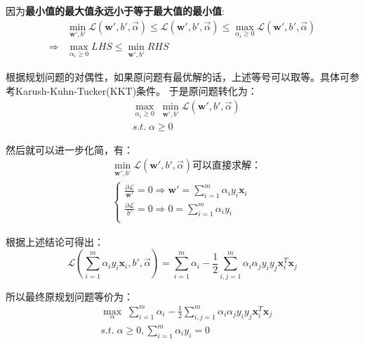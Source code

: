 \documentclass{article}
\begin{document}
因为\textbf{最小值的最大值永远小于等于最大值的最小值}:
\begin{equation}
	\begin{aligned}
		& \mathop{min}\limits_{\textbf{w}',b'}\mathcal{L}(\textbf{w}',b',\overrightarrow{\alpha})\leq\mathcal{L}(\textbf{w}',b',\overrightarrow{\alpha})\leq\mathop{max}\limits_{\alpha_i\geq 0}\mathcal{L}(\textbf{w}',b',\overrightarrow{\alpha})\\
		\Rightarrow & \mathop{max}\limits_{\alpha_i\geq 0}LHS\leq \mathop{min}\limits_{\textbf{w}',b'}RHS
	\end{aligned}
\end{equation}

根据规划问题的对偶性，如果原问题有最优解的话，上述等号可以取等。具体可参考Karush-Kuhn-Tucker(KKT)条件。
于是原问题转化为：
\begin{equation}
	\begin{aligned}
		& \mathop{max}\limits_{\alpha_i\geq 0}\;\mathop{min}\limits_{\textbf{w}',b'}\mathcal{L}(\textbf{w}',b',\overrightarrow{\alpha})\\
		& s.t.\;\alpha\geq 0
	\end{aligned}
\end{equation}

然后就可以进一步化简，有：
\begin{equation}
	\begin{aligned}
		& \mathop{min}\limits_{\textbf{w}',b'}\mathcal{L}(\textbf{w}',b',\overrightarrow{\alpha})\mbox{可以直接求解：}\\
		& \begin{cases}
			\frac{\partial\mathcal{L}}{\textbf{w}'}=0\Rightarrow \textbf{w}'=\sum_{i=1}^m\alpha_iy_i\textbf{x}_i\\
			\frac{\partial\mathcal{L}}{b'}=0\Rightarrow 0=\sum_{i=1}^m\alpha_iy_i\\
		\end{cases}
	\end{aligned}	
\end{equation}

根据上述结论可得出：
\begin{equation}
	\mathcal{L}(\sum_{i=1}^m\alpha_iy_i\textbf{x}_i, b', \overrightarrow{\alpha})=\sum_{i=1}^m\alpha_i-\frac{1}{2}\sum_{i,j=1}^m\alpha_i\alpha_jy_iy_j\textbf{x}_i^T\textbf{x}_j
\end{equation}

所以最终原规划问题等价为：
\begin{equation}
	\begin{aligned}
		& \mathop{max}\limits_{\alpha}\;\sum_{i=1}^m\alpha_i-\frac{1}{2}\sum_{i,j=1}^m\alpha_i\alpha_jy_iy_j\textbf{x}_i^T\textbf{x}_j\\
		& s.t.\;\alpha\geq 0,\sum_{i=1}^m\alpha_iy_i=0\\
	\end{aligned}
\end{equation}
\end{document}
